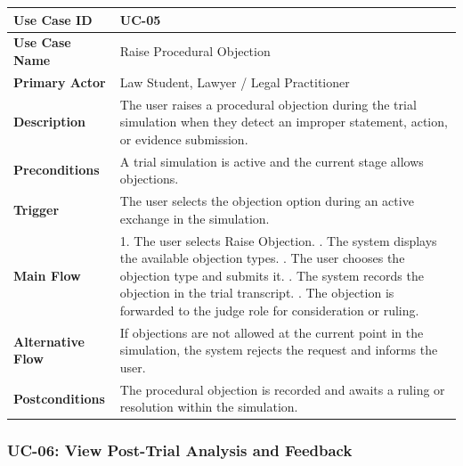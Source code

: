 \begin{longtable}{|p{4cm}|p{10cm}|}
\hline
\textbf{Use Case ID} & UC-05 \\ \hline
\textbf{Use Case Name} & Raise Procedural Objection \\ \hline
\textbf{Primary Actor} & Law Student, Lawyer / Legal Practitioner \\ \hline
\textbf{Description} & The user raises a procedural objection during the trial simulation when they detect an improper statement, action, or evidence submission. \\ \hline
\textbf{Preconditions} & A trial simulation is active and the current stage allows objections. \\ \hline
\textbf{Trigger} & The user selects the objection option during an active exchange in the simulation. \\ \hline
\textbf{Main Flow} & 
1. The user selects Raise Objection. \newline
2. The system displays the available objection types. \newline
3. The user chooses the objection type and submits it. \newline
4. The system records the objection in the trial transcript. \newline
5. The objection is forwarded to the judge role for consideration or ruling. \\ \hline
\textbf{Alternative Flow} & 
If objections are not allowed at the current point in the simulation, the system rejects the request and informs the user. \\ \hline
\textbf{Postconditions} & 
The procedural objection is recorded and awaits a ruling or resolution within the simulation. \\ \hline
\end{longtable}

\subsubsection{UC-06: View Post-Trial Analysis and Feedback}

